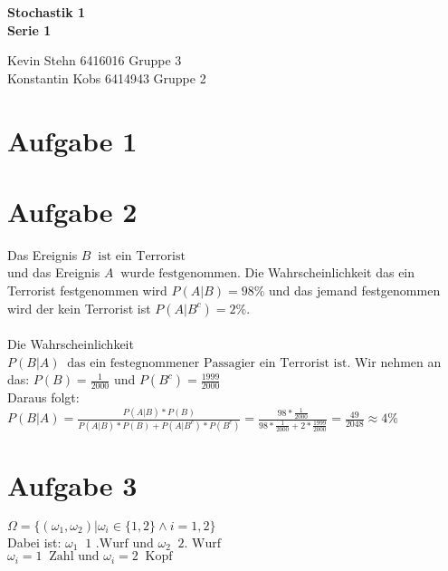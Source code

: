 \documentclass[10pt,a4paper]{article}
\newcommand{\ent}{\mathop{\widehat{=}}}
\begin{document}
\begin{center}
\textbf{Stochastik 1 \\ Serie 1 \\}
\end{center}

\begin{flushright}
Kevin Stehn 6416016 Gruppe 3 \\
Konstantin Kobs 6414943 Gruppe 2
\end{flushright}

\section*{Aufgabe 1}

\section*{Aufgabe 2}
Das Ereignis $B \ent \text{ist ein Terrorist}$ \\ 
und das Ereignis $A \ent \text{wurde festgenommen}$.
Die Wahrscheinlichkeit das ein Terrorist festgenommen wird $P(A|B) = 98\% $ und das jemand festgenommen wird der kein Terrorist ist $P(A|B^{c})= 2\% $.\\\\
Die Wahrscheinlichkeit $P(B|A) \ent \text{das ein festegnommener Passagier ein Terrorist ist}$.
Wir nehmen an das: $P(B) = \frac{1}{2000}$ und $P(B^c)= \frac{1999}{2000}$ \\
Daraus folgt:\\
$P(B|A) = \frac{P(A|B)*P(B)}{P(A|B)*P(B) + P(A|B^c) * P(B^c)} = 
\frac{98*\frac{1}{2000}}{98*\frac{1}{2000}+ 2*\frac{1999}{2000}} = \frac{49}{2048} \approx 4\%$

\section*{Aufgabe 3}
$\Omega = \{(\omega_{1},\omega_{2}) | \omega_{i} \in \{1,2\} \wedge i=1,2\}$ \\
Dabei ist: $\omega_{1} \ent \text{1 .Wurf}$ und $\omega_{2} \ent \text{2. Wurf} $\\
$\omega_{i}=1 \ent \text{Zahl} \text{ und } \omega_{i}=2 \ent \text{Kopf}$
\end{document}
